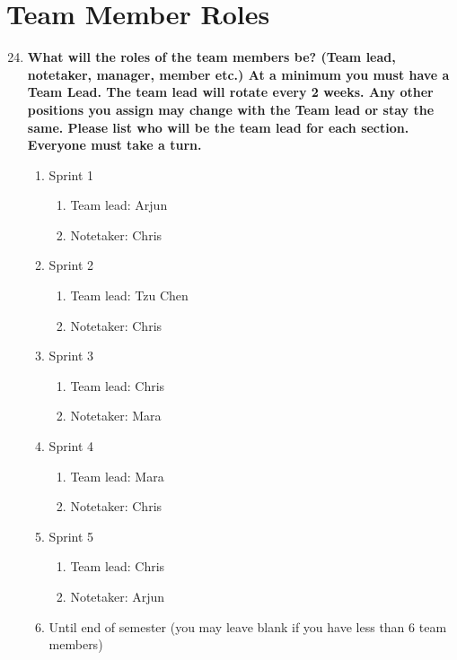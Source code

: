 \documentclass[12pt]{article}
\begin{document}
\section{Team Member Roles}

\begin{enumerate}
    \setcounter{enumi}{23}
    \item \textbf{What will the roles of the team members be? (Team lead, notetaker, manager, member etc.) At a minimum you must have a Team Lead. The team lead will rotate every 2 weeks. Any other positions you assign may change with the Team lead or stay the same. Please list who will be the team lead for each section. Everyone must take a turn.}
    \begin{enumerate}
        \item Sprint 1
        \begin{enumerate}
            \item[i.] Team lead: Arjun
            \item[ii.] Notetaker: Chris
        \end{enumerate}
        \item Sprint 2
        \begin{enumerate}
            \item[i.] Team lead: Tzu Chen
            \item[ii.] Notetaker: Chris
        \end{enumerate}
        \item Sprint 3
        \begin{enumerate}
            \item[i.] Team lead: Chris
            \item[ii.] Notetaker: Mara
        \end{enumerate}
        \item Sprint 4
        \begin{enumerate}
            \item[i.] Team lead: Mara
            \item[ii.] Notetaker: Chris
        \end{enumerate}
        \item Sprint 5
        \begin{enumerate}
            \item[i.] Team lead: Chris
            \item[ii.] Notetaker: Arjun
        \end{enumerate}
        \item Until end of semester (you may leave blank if you have less than 6 team members)
    \end{enumerate}


\end{enumerate}
\end{document}
